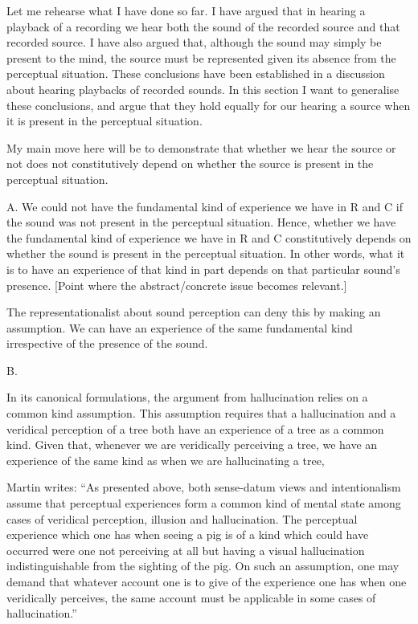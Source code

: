 \documentclass[sloppy, journal, git, bytitle, dodraft]{humapap}
\begin{document}
Let me rehearse what I have done so far. I have argued that in hearing a playback of a recording we hear both the sound of the recorded source and that recorded source. I have also argued that, although the sound may simply be present to the mind, the source must be represented given its absence from the perceptual situation. These conclusions have been established in a discussion about hearing playbacks of recorded sounds. In this section I want to generalise these conclusions, and argue that they hold equally for our hearing a source when it is present in the perceptual situation. 

My main move here will be to demonstrate that whether we hear the source or not does not constitutively depend on whether the source is present in the perceptual situation. 

A. We could not have the fundamental kind of experience we have in R and C if the sound was not present in the perceptual situation. Hence, whether we have the fundamental kind of experience we have in R and C constitutively depends on whether the sound is present in the perceptual situation. In other words, what it is to have an experience of that kind in part depends on that particular sound's presence. [Point where the abstract/concrete issue becomes relevant.]

The representationalist about sound perception can deny this by making an assumption. We can have an experience of the same fundamental kind irrespective of the presence of the sound. 

B. 



In its canonical formulations, the argument from hallucination relies on a common kind assumption. This assumption requires that a hallucination and a veridical perception of a tree both have an experience of a tree as a common kind. Given that, whenever we are veridically perceiving a tree, we have an experience of the same kind as when we are hallucinating a tree,

Martin writes: ``As presented above, both sense-datum views and intentionalism assume that perceptual experiences form a common kind of mental state among cases of veridical perception, illusion and hallucination. The perceptual experience which one has when seeing a pig is of a kind which could have occurred were one not perceiving at all but having a visual hallucination indistinguishable from the sighting of the pig. On such an assumption, one may demand that whatever account one is to give of the experience one has when one veridically perceives, the same account must be applicable in some cases of hallucination.''
\end{document}
